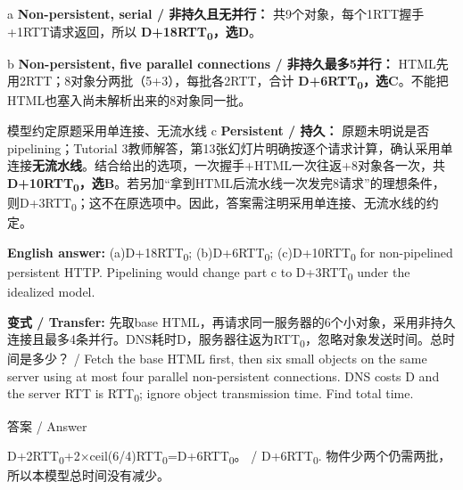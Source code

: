 


a \textbf{Non-persistent, serial / 非持久且无并行：} 共9个对象，每个1RTT握手+1RTT请求返回，所以 \textbf{D+18RTT\textsubscript{0}，选D}。


b \textbf{Non-persistent, five parallel connections / 非持久最多5并行：} HTML先用2RTT；8对象分两批（5+3），每批各2RTT，合计 \textbf{D+6RTT\textsubscript{0}，选C}。不能把HTML也塞入尚未解析出来的8对象同一批。


\begin{StudyBlock}{模型约定}{原题采用单连接、无流水线}
c \textbf{Persistent / 持久：} 原题未明说是否pipelining；Tutorial 3教师解答，第13张幻灯片明确按逐个请求计算，确认采用单连接\textbf{无流水线}。结合给出的选项，一次握手+HTML一次往返+8对象各一次，共 \textbf{D+10RTT\textsubscript{0}，选B}。若另加“拿到HTML后流水线一次发完8请求”的理想条件，则D+3RTT\textsubscript{0}；这不在原选项中。因此，答案需注明采用单连接、无流水线的约定。
\end{StudyBlock}


\textbf{English answer:} (a)D+18RTT\textsubscript{0}; (b)D+6RTT\textsubscript{0}; (c)D+10RTT\textsubscript{0} for non-pipelined persistent HTTP. Pipelining would change part c to D+3RTT\textsubscript{0} under the idealized model.






\textbf{变式 / Transfer:} 先取base HTML，再请求同一服务器的6个小对象，采用非持久连接且最多4条并行。DNS耗时D，服务器往返为RTT\textsubscript{0}，忽略对象发送时间。总时间是多少？ / Fetch the base HTML first, then six small objects on the same server using at most four parallel non-persistent connections. DNS costs D and the server RTT is RTT\textsubscript{0}; ignore object transmission time. Find total time.



\begin{StudySolution}{答案 / Answer}


D+2RTT\textsubscript{0}+2\ensuremath{\times}ceil(6/4)RTT\textsubscript{0}=D+6RTT\textsubscript{0}。 / D+6RTT\textsubscript{0}. 物件少两个仍需两批，所以本模型总时间没有减少。


\end{StudySolution}






